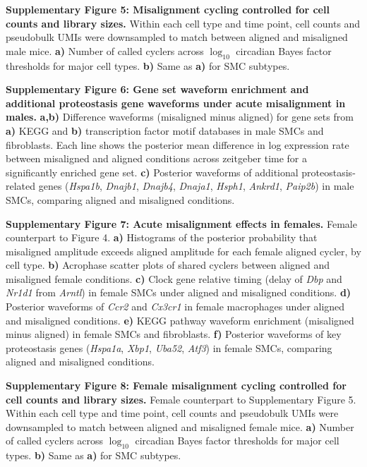 \documentclass[12pt]{article}
\begin{document}
\bigskip

\textbf{Supplementary Figure 5: Misalignment cycling controlled for cell counts and library sizes.}
Within each cell type and time point, cell counts and pseudobulk UMIs were downsampled to match
between aligned and misaligned male mice.
\textbf{a)} Number of called cyclers across $\log_{10}$ circadian Bayes
factor thresholds for major cell types.
\textbf{b)} Same as \textbf{a)} for SMC subtypes.

\bigskip

\textbf{Supplementary Figure 6: Gene set waveform enrichment and additional proteostasis gene
waveforms under acute misalignment in males.}
\textbf{a,b)} Difference waveforms (misaligned minus aligned) for gene sets from \textbf{a)} KEGG and
\textbf{b)} transcription factor motif databases in male SMCs and fibroblasts. Each line shows the
posterior mean difference in log expression rate between misaligned and aligned conditions across
zeitgeber time for a significantly enriched gene set.
\textbf{c)} Posterior waveforms of additional proteostasis-related genes (\textit{Hspa1b},
\textit{Dnajb1}, \textit{Dnajb4}, \textit{Dnaja1}, \textit{Hsph1}, \textit{Ankrd1},
\textit{Paip2b}) in male SMCs, comparing aligned and misaligned conditions.

\bigskip

\textbf{Supplementary Figure 7: Acute misalignment effects in females.}
Female counterpart to Figure 4.
\textbf{a)} Histograms of the posterior probability that misaligned amplitude exceeds aligned amplitude for each female aligned cycler, by cell type.
\textbf{b)} Acrophase scatter plots of shared cyclers between aligned and misaligned female conditions.
\textbf{c)} Clock gene relative timing (delay of \textit{Dbp} and \textit{Nr1d1} from \textit{Arntl}) in female SMCs under aligned and misaligned conditions.
\textbf{d)} Posterior waveforms of \textit{Ccr2} and \textit{Cx3cr1} in female macrophages under aligned and misaligned conditions.
\textbf{e)} KEGG pathway waveform enrichment (misaligned minus aligned) in female SMCs and fibroblasts.
\textbf{f)} Posterior waveforms of key proteostasis genes (\textit{Hspa1a}, \textit{Xbp1}, \textit{Uba52}, \textit{Atf3}) in female SMCs, comparing aligned and misaligned conditions.

\bigskip

\textbf{Supplementary Figure 8: Female misalignment cycling controlled for cell counts and library sizes.}
Female counterpart to Supplementary Figure 5.
Within each cell type and time point, cell counts and pseudobulk UMIs were downsampled to match
between aligned and misaligned female mice.
\textbf{a)} Number of called cyclers across $\log_{10}$ circadian Bayes
factor thresholds for major cell types.
\textbf{b)} Same as \textbf{a)} for SMC subtypes.
\end{document}
